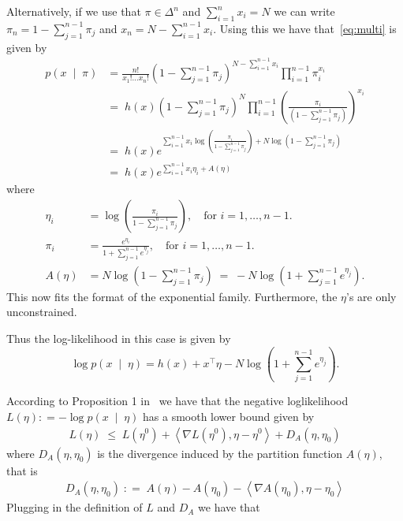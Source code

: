 \documentclass[11pt]{article}
\newcommand{\dotprod}[1]{\left< #1\right>} %
\begin{document}
Alternatively, if we use that $\pi \in \Delta^n $ and $\sum_{i=1}^n x_i = N$ we can write $\pi_n = 1 - \sum_{j=1}^{n-1}\pi_{j}$ and $x_n = N- \sum_{i=1}^{n-1} x_i.$
Using this  we have that~\eqref{eq:multi} is given by
\begin{align}
\label{eq:multisub}
p(x \; \mid \; \pi) & = \frac{n!}{x_1! \ldots x_n!} (1 - \sum_{j=1}^{n-1}\pi_{j})^{N- \sum_{i=1}^{n-1} x_i} \prod_{i=1}^{n-1} \pi_i^{x_i} \nonumber \\
&= \; h(x) (1 - \sum_{j=1}^{n-1}\pi_{j})^{N} \prod_{i=1}^{n-1} \left(\frac{\pi_i}{(1 - \sum_{j=1}^{n-1}\pi_{j})}\right)^{x_i} \nonumber \\
& =\;h(x) e^{\sum_{i=1}^{n-1} x_i \log\left(\frac{\pi_i}{1 - \sum_{j=1}^{n-1}\pi_{j}}\right) + N\log(1 - \sum_{j=1}^{n-1}\pi_{j})} \nonumber \\
& =\;h(x) e^{\sum_{i=1}^{n-1} x_i \eta_i + A(\eta)} 
\end{align}
where
\begin{align*}
\eta_i &= \log\left(\frac{\pi_i}{1 - \sum_{j=1}^{n-1}\pi_{j}}\right), \quad \mbox{for }i=1,\ldots,n-1. \\ 
\pi_i & = \frac{e^{\eta_i}}{1+ \sum_{j=1}^{n-1}e^{\eta_{j}}}, \quad \mbox{for }i=1,\ldots,n-1. \\ 
A(\eta) &= N\log(1 - \sum_{j=1}^{n-1}\pi_{j}) \; = \; -N\log(1 + \sum_{j=1}^{n-1}e^{\eta_{j}}).
\end{align*}
This now fits the format of the exponential family. Furthermore, the $\eta$'s are only unconstrained.

Thus the log-likelihood in this case is given by
\begin{equation}
\log p(x \; \mid \; \eta)=  h(x) +x^\top \eta -N\log(1 + \sum_{j=1}^{n-1}e^{\eta_{j}}).
\end{equation}

According to Proposition 1 in~\cite{MarkEM} we have that the negative loglikelihood $L(\eta) : = -\log p(x \; \mid \; \eta)$ has a smooth lower bound given by
\begin{align*}
L(\eta) \; \leq \;  L(\eta^0) +  \dotprod{ \nabla L(\eta^0), \eta -\eta^0  } + D_A(\eta,\eta_0)
\end{align*}
where $D_A(\eta,\eta_0)$ is the divergence induced by the partition function $A(\eta)$, that is
\begin{align}
D_A(\eta,\eta_0) \; : = \; A(\eta) - A(\eta_0) - \dotprod{\nabla A(\eta_0), \eta - \eta_0}
\end{align}
Plugging in the definition of $L$ and $D_A$ we have that
\end{document}
